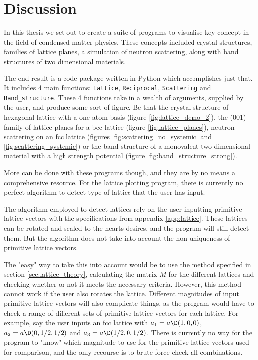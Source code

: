 \documentclass[main.tex]{subfiles}
\begin{document}
	\section{Discussion}
	In this thesis we set out to create a suite of programs to visualise key concept in the field of condensed matter physics. These concepts included crystal structures, families of lattice planes, a simulation of neutron scattering, along with band structures of two dimensional materials.
	
	The end result is a code package written in Python which accomplishes just that. It includes 4 main functions: \texttt{Lattice}, \texttt{Reciprocal}, \texttt{Scattering} and \texttt{Band\_structure}. These 4 functions take in a wealth of arguments, supplied by the user, and produce some sort of figure. Be that the crystal structure of hexagonal lattice with a one atom basis (figure \ref{fig:lattice_demo_2}), the (001) family of lattice planes for a bcc lattice (figure \ref{fig:lattice_planes}), neutron scattering on an fcc lattice (figures \ref{fig:scattering_no_systemic} and \ref{fig:scattering_systemic}) or the band structure of a monovalent two dimensional material with a high strength potential (figure \ref{fig:band_structure_strong}).

	More can be done with these programs though, and they are by no means a comprehensive resource. For the lattice plotting program, there is currently no perfect algorithm to detect type of lattice that the user has input.
	
	The algorithm employed to detect lattices rely on the user inputting primitive lattice vectors with the specifications from appendix \ref{app:lattice}. These lattices can be rotated and scaled to the hearts desires, and the program will still detect them. But the algorithm does not take into account the non-uniqueness of primitive lattice vectors. 
	
	The "easy" way to take this into account would be to use the method specified in section \ref{sec:lattice_theory}, calculating the matrix $ M $ for the different lattices and checking whether or not it meets the necessary criteria. However, this method cannot work if the user also rotates the lattice. Different magnitudes of input primitive lattice vectors will also complicate things, as the program would have to check a range of different sets of primitive lattice vectors for each lattice. For example, say the user inputs an fcc lattice with $ a_1 = a \D(1,0,0) $, $ a_2 = a\D(0, 1/2, 1/2) $ and $ a_3 = a\D(1/2, 0, 1/2) $. There is currently no way for the program to "know" which magnitude to use for the primitive lattice vectors used for comparison, and the only recourse is to brute-force check all combinations.
\end{document}
